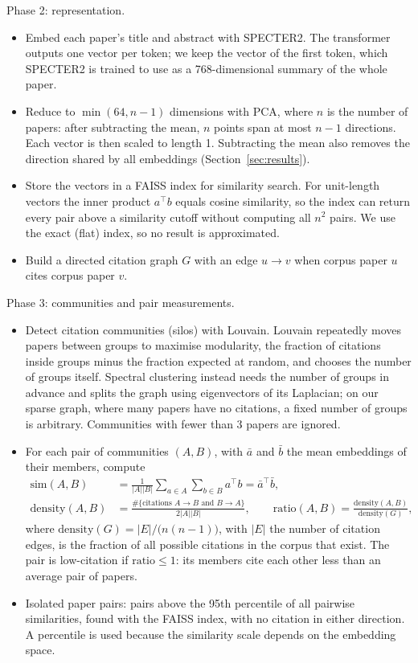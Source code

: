 \documentclass[11pt,a4paper]{article}
\begin{document}
Phase 2: representation.
\begin{itemize}
  \item Embed each paper's title and abstract with SPECTER2. The transformer outputs one vector per token; we keep the vector of the first token, which SPECTER2 is trained to use as a 768-dimensional summary of the whole paper.
  \item Reduce to $\min(64, n-1)$ dimensions with PCA, where $n$ is the number of papers: after subtracting the mean, $n$ points span at most $n-1$ directions. Each vector is then scaled to length 1. Subtracting the mean also removes the direction shared by all embeddings (Section~\ref{sec:results}).
  \item Store the vectors in a FAISS index for similarity search. For unit-length vectors the inner product $a^\top b$ equals cosine similarity, so the index can return every pair above a similarity cutoff without computing all $n^2$ pairs. We use the exact (flat) index, so no result is approximated.
  \item Build a directed citation graph $G$ with an edge $u \to v$ when corpus paper $u$ cites corpus paper $v$.
\end{itemize}

Phase 3: communities and pair measurements.
\begin{itemize}
  \item Detect citation communities (silos) with Louvain. Louvain repeatedly moves papers between groups to maximise modularity, the fraction of citations inside groups minus the fraction expected at random, and chooses the number of groups itself. Spectral clustering instead needs the number of groups in advance and splits the graph using eigenvectors of its Laplacian; on our sparse graph, where many papers have no citations, a fixed number of groups is arbitrary. Communities with fewer than 3 papers are ignored.
  \item For each pair of communities $(A, B)$, with $\bar{a}$ and $\bar{b}$ the mean embeddings of their members, compute
  \begin{align*}
    \mathrm{sim}(A,B) &= \frac{1}{|A||B|}\sum_{a \in A}\sum_{b \in B} a^\top b = \bar{a}^\top \bar{b}, \\
    \mathrm{density}(A,B) &= \frac{\#\{\text{citations } A \to B \text{ and } B \to A\}}{2|A||B|}, \qquad
    \mathrm{ratio}(A,B) = \frac{\mathrm{density}(A,B)}{\mathrm{density}(G)},
  \end{align*}
  where $\mathrm{density}(G) = |E| / \bigl(n(n-1)\bigr)$, with $|E|$ the number of citation edges, is the fraction of all possible citations in the corpus that exist. The pair is low-citation if $\mathrm{ratio} \leq 1$: its members cite each other less than an average pair of papers.
  \item Isolated paper pairs: pairs above the 95th percentile of all pairwise similarities, found with the FAISS index, with no citation in either direction. A percentile is used because the similarity scale depends on the embedding space.
\end{itemize}
\end{document}
